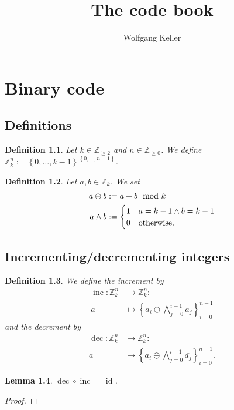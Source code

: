 \documentclass[10pt,a4paper,BCOR = 12mm,DIV=15]{scrbook}
\author{Wolfgang Keller}
\title{The code book}
\newtheorem{Def}{Definition}
\newtheorem{Le}[Def]{Lemma}
\newcommand{\id}{\operatorname{id}}
\newcommand{\inc}{\operatorname{inc}}
\newcommand{\dec}{\operatorname{dec}}
\begin{document}
\chapter{Binary code}

\section{Definitions}

\begin{Def}
Let $k \in \mathbb{Z}_{\geq 2}$ and $n \in \mathbb{Z}_{\geq 0}$. We define $\mathbb{Z}_k^n := \left\{0, \ldots, k-1\right\}^{\left\{0, \ldots, n-1\right\}}$.
\end{Def}

\begin{Def}
Let $a, b \in \mathbb{Z}_k$. We set
\begin{align*}
a \oplus b & := a + b \mod k \\
a \wedge b & := \begin{cases}
1 & a=k-1 \wedge b=k-1 \\
0 & \textnormal{otherwise.}
\end{cases}
\end{align*}
\end{Def}

\section{Incrementing/decrementing integers}

\begin{Def}
We define the \emph{increment} by
\begin{align*}
\inc: \mathbb{Z}_k^n & \rightarrow \mathbb{Z}_k^n: \\
a & \mapsto \left\{a_i \oplus \bigwedge_{j=0}^{i-1} a_j\right\}_{i=0}^{n-1}
\end{align*}
and the \emph{decrement} by
\begin{align*}
\dec: \mathbb{Z}_k^n & \rightarrow \mathbb{Z}_k^n: \\
a & \mapsto \left\{a_i \ominus \bigwedge_{j=0}^{i-1} \overline{a_j}\right\}_{i=0}^{n-1}.
\end{align*}
\end{Def}

\begin{Le}
$\dec \circ \inc = \id$.
\end{Le}
\begin{proof}

\end{proof}
\end{document}
